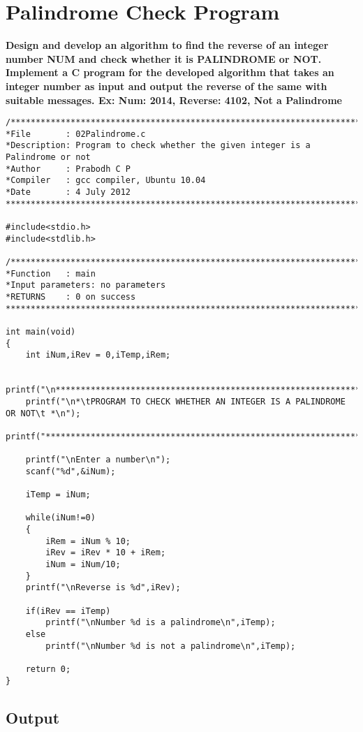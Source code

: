 \documentclass[a4paper]{report}
\begin{document}
\chapter{Palindrome Check Program}
{\selectfont \textbf{Design and develop an algorithm to find the reverse of an integer number NUM and check whether it is PALINDROME or NOT. Implement a C program for the developed algorithm that takes an integer number as input and output the reverse of the same with suitable messages. Ex: Num: 2014, Reverse: 4102, Not a Palindrome
}
}
\begin{verbatim}
/***************************************************************************
*File		: 02Palindrome.c
*Description: Program to check whether the given integer is a Palindrome or not
*Author		: Prabodh C P
*Compiler	: gcc compiler, Ubuntu 10.04
*Date		: 4 July 2012
***************************************************************************/

#include<stdio.h>
#include<stdlib.h>

/***************************************************************************
*Function	: main
*Input parameters: no parameters
*RETURNS	: 0 on success
***************************************************************************/

int main(void)
{
	int iNum,iRev = 0,iTemp,iRem;

	printf("\n**************************************************************************");
	printf("\n*\tPROGRAM TO CHECK WHETHER AN INTEGER IS A PALINDROME OR NOT\t *\n");
	printf("**************************************************************************");

	printf("\nEnter a number\n");
	scanf("%d",&iNum);

	iTemp = iNum;

	while(iNum!=0)
	{
		iRem = iNum % 10;
		iRev = iRev * 10 + iRem;
		iNum = iNum/10;
	}
	printf("\nReverse is %d",iRev);

	if(iRev == iTemp)
		printf("\nNumber %d is a palindrome\n",iTemp);
	else
		printf("\nNumber %d is not a palindrome\n",iTemp);

	return 0;
}

\end{verbatim}
\section*{Output}
\end{document}
